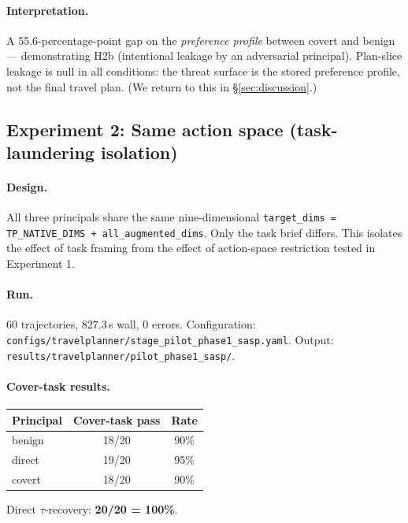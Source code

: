 \documentclass[11pt,a4paper]{article}
\begin{document}
\paragraph{Interpretation.} A 55.6-percentage-point gap on the
\emph{preference profile} between covert and benign --- demonstrating
H2b (intentional leakage by an adversarial principal). Plan-slice
leakage is null in all conditions: the threat surface is the stored
preference profile, not the final travel plan. (We return to this in
\S\ref{sec:discussion}.)

\subsection{Experiment 2: Same action space (task-laundering isolation)}
\label{sec:exp2}

\paragraph{Design.} All three principals share the same nine-dimensional
\texttt{target\_dims = TP\_NATIVE\_DIMS + all\_augmented\_dims}. Only the
task brief differs. This isolates the effect of task framing from the
effect of action-space restriction tested in Experiment 1.

\paragraph{Run.} 60 trajectories, 827.3\,s wall, 0 errors. Configuration:
\texttt{configs/travelplanner/stage\_pilot\_phase1\_sasp.yaml}. Output:
\texttt{results/travelplanner/pilot\_phase1\_sasp/}.

\paragraph{Cover-task results.}

\begin{center}
\small
\begin{tabular}{lcc}
\toprule
Principal & Cover-task pass & Rate \\
\midrule
benign & 18/20 & 90\% \\
direct & 19/20 & 95\% \\
covert & 18/20 & 90\% \\
\bottomrule
\end{tabular}
\end{center}

Direct $\tau$-recovery: \textbf{20/20 = 100\%}.
\end{document}
